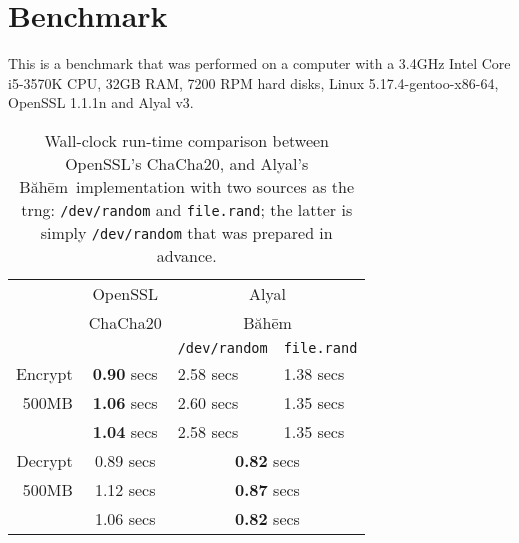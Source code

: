 \documentclass[twocolumn,hidelinks]{article}
\newcommand{\baheem}{Băhēm}
\newcommand{\alyal}{Alyal}
\begin{document}
\section{Benchmark}
This is a benchmark that was performed on a computer with a 3.4GHz Intel
Core i5-3570K CPU, 32GB RAM, 7200 RPM hard disks, Linux
5.17.4-gentoo-x86-64, OpenSSL 1.1.1n and Alyal v3.

\begin{table}[tbh]
    \centering
    \begin{tabular}{rcll}
                & OpenSSL            & \multicolumn{2}{c}{\alyal}                \\
                & ChaCha20           & \multicolumn{2}{c}{\baheem}               \\
                &                    & \texttt{/dev/random} & \texttt{file.rand} \\\hline
        Encrypt & \textbf{0.90} secs & 2.58 secs            & 1.38 secs          \\
        500MB   & \textbf{1.06} secs & 2.60 secs            & 1.35 secs          \\
                & \textbf{1.04} secs & 2.58 secs            & 1.35 secs          \\\hline
        Decrypt & 0.89 secs          & \multicolumn{2}{c}{\textbf{0.82} secs}    \\
        500MB   & 1.12 secs          & \multicolumn{2}{c}{\textbf{0.87} secs}    \\
                & 1.06 secs          & \multicolumn{2}{c}{\textbf{0.82} secs}    \\
    \end{tabular}
    \caption{Wall-clock run-time comparison between OpenSSL's ChaCha20, and
    \alyal's \baheem\ implementation with two sources as the \gls{trng}:
    \texttt{/dev/random} and \texttt{file.rand};  the latter is simply
    \texttt{/dev/random} that was prepared in advance.}
    \label{tbl_benchmark}
\end{table}
\end{document}
